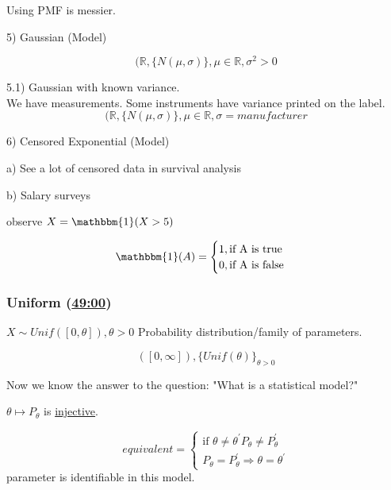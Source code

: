 
Using PMF is messier.



5) Gaussian (Model) \\


$$
(\mathbb{R}, \{N(\mu,\sigma)\}, \mu \in \mathbb{R}, \sigma^2 > 0
$$

5.1) Gaussian with known variance. \\

We have measurements.  Some instruments have variance printed on the label.\\

$$
(\mathbb{R}, \{N(\mu,\sigma)\}, \mu \in \mathbb{R}, \sigma=manufacturer
$$

6) Censored Exponential (Model)

a) See a lot of censored data in survival analysis

b) Salary surveys

observe $X=\mathbbm{1}(X>5)$

$$
\mathbbm{1}(A) = \begin{cases} 
1, \text{if A is true}\\
0, \text{if A is false}
\end{cases}
$$
\subsubsection{Uniform (\href{https://youtu.be/TSkDZbGS94k?t=49m00s}{49:00})}

$X \sim Unif([0,\theta]), \theta > 0$ Probability distribution/family of parameters.

$$
([0,\infty]), \{Unif(\theta)\}_{\theta > 0}
$$


  Now we know the answer to the question: "What is a statistical model?"\\



$\theta \mapsto P_{\theta}$ is \href{https://en.wikipedia.org/wiki/Injective_function}{injective}.

$$
equivalent = \begin{cases}
    \text{if } \theta \ne \theta^{\prime} P_{\theta} \ne P_{\theta}^{\prime}\\
    P_{\theta} = P_{\theta}^{\prime} \Rightarrow \theta = \theta^{\prime}
\end{cases}
$$
parameter is identifiable in this model.

